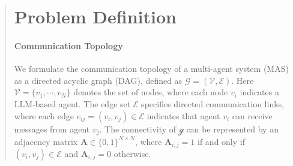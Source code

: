 \documentclass[11pt]{article}
\begin{document}
\begin{abstract}
\section{Problem Definition}
\paragraph{{Communication Topology}}
We formulate the communication topology of a multi-agent system (MAS) as a directed acyclic graph (DAG), defined as $\mathcal{G} = (\mathcal{V},\mathcal{E})$. Here $\mathcal{V} = \{v_{1},\cdots,{v}_{N}\}$ denotes the set of nodes, where each node $v_i$ indicates a LLM-based agent. The edge set $\mathcal{E}$ specifies directed communication links, where each edge $ e_{ij} = (v_{i}, v_{j}) \in \mathcal{E}$ indicates that agent $v_{i}$ can receive messages from agent $v_{j}$. The connectivity of $\mathcal{g}$ can be represented by an adjacency matrix $\mathbf{A} \in \{0,1\}^{N \times N}$, where $\mathbf{A}_{i,j} = 1$ if and only if $ (v_{i}, v_{j}) \in \mathcal{E}$ and $\mathbf{A}_{i,j} = 0$ otherwise.


\end{abstract}
\end{document}
